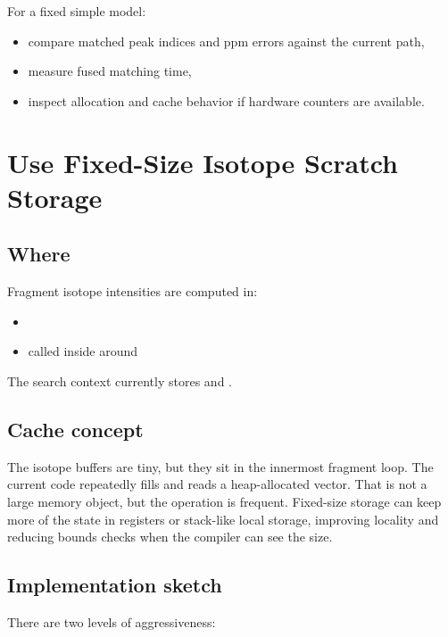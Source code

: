 \documentclass[11pt]{article}
\begin{document}
For a fixed simple model:

\begin{itemize}
  \item compare matched peak indices and ppm errors against the current path,
  \item measure fused matching time,
  \item inspect allocation and cache behavior if hardware counters are available.
\end{itemize}

\section{Use Fixed-Size Isotope Scratch Storage}

\subsection*{Where}

Fragment isotope intensities are computed in:

\begin{itemize}
  \item {}
  \item called inside  around 
\end{itemize}

The search context currently stores  and
.

\subsection*{Cache concept}

The isotope buffers are tiny, but they sit in the innermost fragment loop. The
current code repeatedly fills and reads a heap-allocated vector. That is not a
large memory object, but the operation is frequent. Fixed-size storage can keep
more of the state in registers or stack-like local storage, improving locality
and reducing bounds checks when the compiler can see the size.

\subsection*{Implementation sketch}

There are two levels of aggressiveness:
\end{document}
